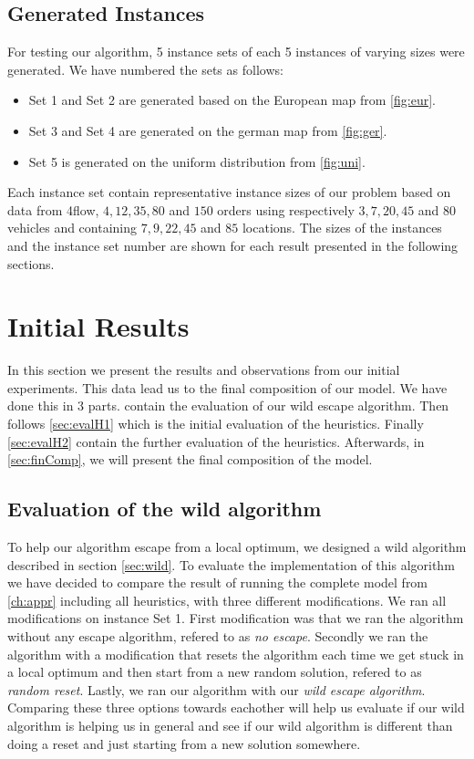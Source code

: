 \documentclass[../main.tex]{subfiles}
\begin{document}
\subsection{Generated Instances}
\label{sec:geni}
For testing our algorithm, 5 instance sets of each 5 instances of varying sizes were generated. 
We have numbered the sets as follows:
\begin{itemize}
    \item Set 1 and Set 2 are generated based on the European map from \cref{fig:eur}.
    \item Set 3 and Set 4 are generated on the german map from \cref{fig:ger}.
    \item Set 5 is generated on the uniform distribution from \cref{fig:uni}.
\end{itemize}

Each instance set contain representative instance sizes of our problem based on data from 4flow, $4, 12, 35, 80$ and $150$ orders using respectively $3, 7, 20, 45$ and $80$ vehicles and containing $7, 9, 22, 45$ and $85$ locations.  
The sizes of the instances and the instance set number are shown for each result presented in the following sections.

\section{Initial Results}
\label{sec:res}
In this section we present the results and observations from our initial experiments. 
This data lead us to the final composition of our model.
We have done this in 3 parts.  contain the evaluation of our wild escape algorithm. Then follows \cref{sec:evalH1} which is the initial evaluation of the heuristics. Finally \cref{sec:evalH2} contain the further evaluation of the heuristics.
Afterwards, in \cref{sec:finComp}, we will present the final composition of the model.

\subsection{Evaluation of the wild algorithm}
\label{sec:evalw}
To help our algorithm escape from a local optimum, we designed a wild algorithm described in section \cref{sec:wild}. 
To evaluate the implementation of this algorithm we have decided to compare the result of running the complete model from \cref{ch:appr} including all heuristics, with three different modifications.
We ran all modifications on instance Set 1.
First modification was that we ran the algorithm without any escape algorithm, refered to as \emph{no escape}.
Secondly we ran the algorithm with a modification that resets the algorithm each time we get stuck in a local optimum and then start from a new random solution, refered to as \emph{random reset}.
Lastly, we ran our algorithm with our \emph{wild escape algorithm}.
Comparing these three options towards eachother will help us evaluate if our wild algorithm is helping us in general and see if our wild algorithm is different than doing a reset and just starting from a new solution somewhere.
\end{document}
